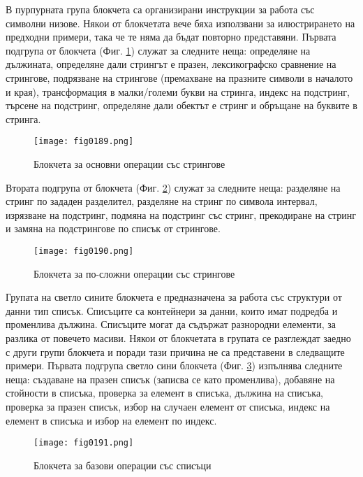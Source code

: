 В пурпурната група блокчета са организирани инструкции за работа със символни низове. Някои от блокчетата вече бяха използвани за илюстрирането на предходни примери, така че те няма да бъдат повторно представяни. Първата подгрупа от блокчета (Фиг. \ref{fig0189}) служат за следните неща: определяне на дължината, определяне дали стрингът е празен, лексикографско сравнение на стрингове, подрязване на стрингове (премахване на празните символи в началото и края), трансформация в малки/големи букви на стринга, индекс на подстринг, търсене на подстринг, определяне дали обектът е стринг и обръщане на буквите в стринга.

\begin{figure}[H]
  \centering
  \texttt{[image: fig0189.png]}
  \caption{Блокчета за основни операции със стрингове}
\label{fig0189}
\end{figure}

Втората подгрупа от блокчета (Фиг. \ref{fig0190}) служат за следните неща: разделяне на стринг по зададен разделител, разделяне на стринг по символа интервал, изрязване на подстринг, подмяна на подстринг със стринг, прекодиране на стринг и замяна на подстрингове по списък от стрингове.

\begin{figure}[H]
  \centering
  \texttt{[image: fig0190.png]}
  \caption{Блокчета за по-сложни операции със стрингове}
\label{fig0190}
\end{figure}

Групата на светло сините блокчета е предназначена за работа със структури от данни тип списък. Списъците са контейнери за данни, които имат подредба и променлива дължина. Списъците могат да съдържат разнородни елементи, за разлика от повечето масиви. Някои от блокчетата в групата се разглеждат заедно с други групи блокчета и поради тази причина не са представени в следващите примери. Първата подгрупа светло сини блокчета (Фиг. \ref{fig0191}) изпълнява следните неща: създаване на празен списък (записва се като променлива), добавяне на стойности в списъка, проверка за елемент в списъка, дължина на списъка, проверка за празен списък, избор на случаен елемент от списъка, индекс на елемент в списъка и избор на елемент по индекс.

\begin{figure}[H]
  \centering
  \texttt{[image: fig0191.png]}
  \caption{Блокчета за базови операции със списъци}
\label{fig0191}
\end{figure}

